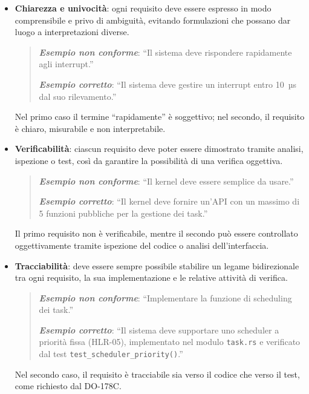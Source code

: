 \documentclass[italian, Lau, oneside]{sapthesis} %
\begin{document}
\begin{itemize}
    \item \textbf{Chiarezza e univocità}: ogni requisito deve essere espresso in modo comprensibile e privo di ambiguità, evitando formulazioni che possano dar luogo a interpretazioni diverse.  

    \begin{quote}
        \textbf{\textit{Esempio non conforme}}: “Il sistema deve rispondere rapidamente agli interrupt.”  

        \textbf{\textit{Esempio corretto}}: “Il sistema deve gestire un interrupt entro 10~µs dal suo rilevamento.”
    \end{quote}

    Nel primo caso il termine “rapidamente” è soggettivo; nel secondo, il requisito è chiaro, misurabile e non interpretabile.

    \vspace{0.5em}

    \item \textbf{Verificabilità}: ciascun requisito deve poter essere dimostrato tramite analisi, ispezione o test, così da garantire la possibilità di una verifica oggettiva.  

    \begin{quote}
        \textbf{\textit{Esempio non conforme}}: “Il kernel deve essere semplice da usare.”  

        \textbf{\textit{Esempio corretto}}: “Il kernel deve fornire un’API con un massimo di 5 funzioni pubbliche per la gestione dei task.”
    \end{quote}

    Il primo requisito non è verificabile, mentre il secondo può essere controllato oggettivamente tramite ispezione del codice o analisi dell’interfaccia.

    \vspace{0.5em}

    \item \textbf{Tracciabilità}: deve essere sempre possibile stabilire un legame bidirezionale tra ogni requisito, la sua implementazione e le relative attività di verifica.  

    \begin{quote}
        \textbf{\textit{Esempio non conforme}}: “Implementare la funzione di scheduling dei task.”  

        \textbf{\textit{Esempio corretto}}: “Il sistema deve supportare uno scheduler a priorità fissa (HLR-05), implementato nel modulo \texttt{task.rs} e verificato dal test \texttt{test\_scheduler\_priority()}.”
    \end{quote}

    Nel secondo caso, il requisito è tracciabile sia verso il codice che verso il test, come richiesto dal DO-178C.
\end{itemize}
\end{document}
